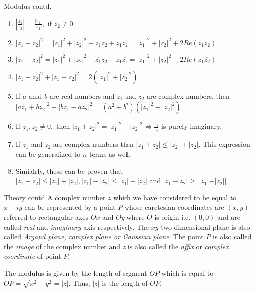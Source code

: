\documentclass[aspectratio=169,8pt]{beamer}
\newcounter{counter}
\begin{document}
\begin{frame}{Modulus contd.}
  \begin{enumerate}
    \setcounter{enumi}{\value{counter}}
  \item $\left|\frac{z_1}{z_2}\right| = \frac{|z_1|}{z_2},$ if $z_2\neq 0$
  \item $|z_1 + z_2|^2 = |z_1|^2 + |z_2|^2 + \overline{z_1}z_2 + z_1\overline{z_2} = |z_1|^2 + |z_2|^2 + 2Re(z_1\overline{z_2})$
  \item $|z_1 - z_2|^2 = |z_1|^2 + |z_2|^2 - \overline{z_1}z_2 - z_1\overline{z_2} = |z_1|^2 + |z_2|^2 - 2Re(z_1\overline{z_2})$
  \item $|z_1 + z_2|^2 + |z_1 - z_2|^2 = 2(|z_1|^2 + |z_2|^2)$
  \item If $a$ amd $b$ are real numbers and $z_1$ and $z_2$ are complex numbers, then\\
    $|az_1 + bz_2|^2 + |bz_1 - az_2|^2 = (a^2 + b^2)(|z_1|^2 + |z_2|^2)$
  \item If $z_1, z_2\neq 0,$ then $|z_1 + z_2|^2 = |z_1|^2 + |z_2|^2 \Leftrightarrow \frac{z_1}{z_2}$ is purely imaginary.
  \item If $z_1$ and $z_2$ are complex numbers then $|z_1 + z_2|\leq |z_2| + |z_2|.$ This expression can be generalized to $n$ terms as well.
  \item Simialrly, these can be proven that $|z_1 - z_2|\leq |z_1| + |z_2|, |z_1| - |z_2|\leq |z_1| + |z_2|$ and $|z_1 - z_2|\geq ||z_1| - |z_2||$
  \end{enumerate}
\end{frame}
\begin{frame}{Theory contd}
  A complex number $z$ which we have considered to be equal to $x + iy$ can be
  represented by a point $P$ whose caretesian coordinates are $(x, y)$ referred
  to rectangular axes $Ox$ and $Oy$ where $O$ is origin i.e. $(0, 0)$ and are
  called \textit{real} and \textit{imaginary} axis respectively. The $xy$ two
  dimensional plane is also called \textit{Argand plane, complex plane or
    Gaussian plane}. The point $P$ is also called the \textit{image} of the
  complex number and $z$ is also called the \textit{affix} or \textit{complex
    coordinate} of point $P.$

  The modulus is given by the length of segment $OP$ which is equal to $OP =
  \sqrt{x^2 + y^2} = |z|.$ Thus, $|z|$ is the length of $OP$.
\end{frame}
\end{document}
